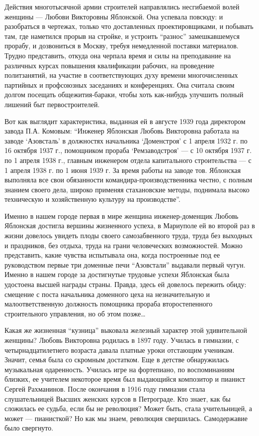 Действия многотысячной армии строителей направлялись несгибаемой волей женщины
— Любови Викторовны Яблонской. Она успевала повсюду: и разобраться в чертежах,
только что доставленных проектировщиками, и побывать там, где наметился прорыв
на стройке, и устроить \enquote{разнос} замешкавшемуся прорабу, и дозвониться в Москву,
требуя немедленной поставки материалов. Трудно представить, откуда она черпала
время и силы на преподавание на различных курсах повышения квалификации
рабочих, на проведение политзанятий, на участие в соответствующих духу времени
многочисленных партийных и профсоюзных заседаниях и конференциях. Она считала
своим долгом посещать общежития-бараки, чтобы хоть как-нибудь улучшить полный
лишений быт первостроителей.

Вот как выглядит характеристика, выданная ей в августе 1939 года директором
завода П.А. Комовым: \enquote{Инженер Яблонская Любовь Викторовна работала на заводе
\enquote{Азовсталь} в должностях начальника \enquote{Доменстроя} с 1 апреля 1932 г. по 16
октября 1937 г., помощником прораба \enquote{Ремзаводстроя} — с 10 октября 1937 г. по 1
апреля 1938 г., главным инженером отдела капитального строительства — с 1
апреля 1938 г. по 1 июня 1939 г.  За время работы на заводе тов. Яблонская
выполняла все свои обязанности командира-производственника честно, с полным
знанием своего дела, широко применяя стахановские методы, поднимала высоко
техническую и хозяйственную культуру на производстве}.

Именно в нашем городе первая в мире женщина инженер-доменщик Любовь Яблонская
достигла вершины жизненного успеха, в Мариуполе ей во второй раз в жизни
довелось увидеть плоды своего самозабвенного труда, труда без выходных и
праздников, без отдыха, труда на грани человеческих возможностей. Можно
представить, какие чувства испытывала она, когда построенные под ее
руководством первые три доменные печи \enquote{Азовстали} выдавали первый чугун. Именно
в нашем городе за достигнутые трудовые успехи Яблонская была удостоена высшей
награды страны. Правда, здесь ей довелось пережить обиду: смещение с поста
начальника доменного цеха на незначительную и малоответственную должность
помощника прораба второстепенного строительного управления, но об этом позже…

Какая же жизненная \enquote{кузница} выковала железный характер этой удивительной
женщины? Любовь Викторовна родилась в 1897 году. Училась в гимназии, с
четырнадцатилетнего возраста давала платные уроки отстающим ученикам. Значит,
семья была со скромным достатком. Еще в детстве обнаружилась музыкальная
одаренность. Училась игре на фортепиано, по воспоминаниям близких, ее учителем
некоторое время был выдающийся композитор и пианист Сергей Рахманинов. После
окончания в 1916 году гимназии стала слушательницей Высших женских курсов в
Петрограде. Кто знает, как бы сложилась ее судьба, если бы не революция? Может
быть, стала учительницей, а может — пианисткой? Но как мы знаем, революция
свершилась. Самодержавие было свергнуто.

